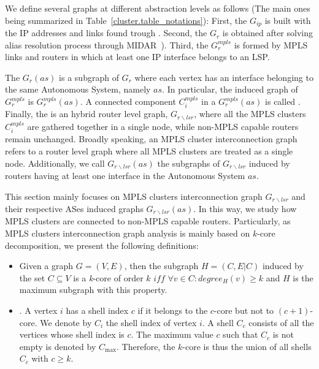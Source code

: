 We define several graphs at different abstraction levels as follows (The main
ones being summarized in Table~\ref{cluster.table_notations}): First, the
 $G_{ip}$ is built with the IP addresses and links found
trough \traceroute. Second, the  $G_{r}$ is obtained
after solving alias resolution process through MIDAR~\cite{Keys13}). Third, the
 $G^{mpls}_{r}$ is formed by MPLS links and routers
in which at least one IP interface belongs to an LSP.

The  $G_{r}(as)$ is a subgraph of $G_{r}$ where each
vertex has an interface belonging to the same Autonomous System, namely $as$.
In particular, the induced graph of $G_r^{mpls}$ is $G^{mpls}_{r}(as)$.
A connected component $C^{mpls}_{i}$ in a $G^{mpls}_{r}(as)$ is called . Finally, the  is an hybrid
router level graph,  $G_{r\backslash lsr}$, where all the MPLS clusters
$C^{mpls}_{i}$ are gathered together in a single node, while non-MPLS capable
routers remain unchanged. Broadly speaking, an MPLS cluster interconnection
graph refers to a router level graph where all MPLS clusters are treated as a
single node. Additionally, we call $G_{r\backslash lsr}(as)$ the subgraphs of
$G_{r\backslash lsr}$ induced by routers having at least one interface in the
Autonomous System $as$.

This section mainly focuses on MPLS clusters interconnection graph
$G_{r\backslash lsr}$ and their respective ASes induced graphs $G_{r\backslash
lsr}(as)$. In this way, we study how MPLS clusters are connected to non-MPLS
capable routers. Particularly, as MPLS clusters interconnection graph analysis
is mainly based on $k$-core decomposition, we  present the following
definitions:
\begin{itemize}
  \item{} Given a graph $G=(V,E)$, then the
  subgraph $H=(C,E|C)$ induced by the set $ C\subseteq V$ is a \textit{k}-core
  of order $k$ $iff$ $\forall v \in C: degree_{H}(v)\geq k$ and $H$ is the
  maximum subgraph with this property.      
  \item{}. A vertex $i$ has a shell index $c$ if it
  belongs to the $c$-core but not to $(c+1)$-core. We denote by $C_i$ the shell
  index of vertex $i$. A shell $C_c$ consists of all the vertices whose shell
  index is $c$. The maximum value $c$ such that $C_c$ is not empty is denoted by
  $C_{\max}$.  Therefore, the $k$-core is thus the union of all shells $C_c$ with
  $c \geq k$.
\end{itemize}


